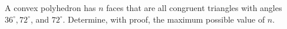 A convex polyhedron has $n$ faces that are all congruent triangles with angles $36^{\circ}, 72^{\circ}$, and $72^{\circ}$.
Determine, with proof, the maximum possible value of $n$.
